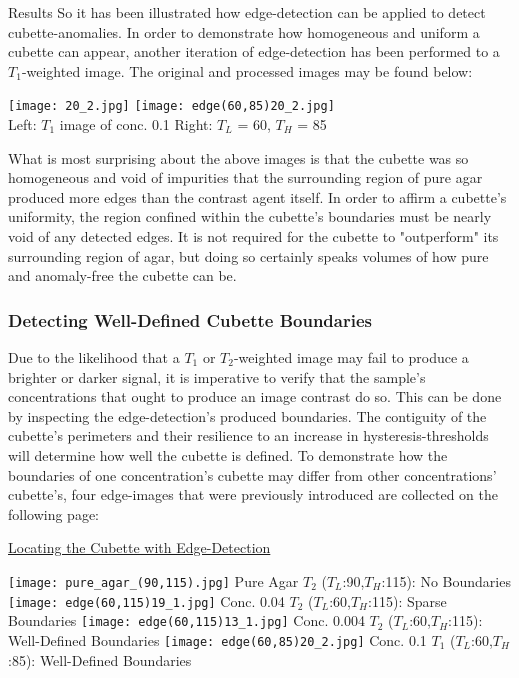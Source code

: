 \documentclass[a4paper,12pt]{article}
\begin{document}
\begin{section}{Results}
So it has been illustrated how edge-detection can be applied to detect cubette-anomalies. In order to demonstrate how homogeneous and uniform a cubette can appear, another iteration of edge-detection has been performed to a $T_1$-weighted image. The original and processed images may be found below:

\begin{center}
\texttt{[image: 20\_2.jpg]}
\texttt{[image: edge(60,85)20\_2.jpg]}\\
\small{Left: $T_1$ image of conc. 0.1} \hspace{13mm} \small{Right: $T_L$ = 60, $T_H$ = 85}
\end{center}

What is most surprising about the above images is that the cubette was so homogeneous and void of impurities that the surrounding region of pure agar produced more edges than the contrast agent itself. In order to affirm a cubette's uniformity, the region confined within the cubette's boundaries must be nearly void of any detected edges. It is not required for the cubette to "outperform" its surrounding region of agar, but doing so certainly speaks volumes of how pure and anomaly-free the cubette can be.

\subsubsection{Detecting Well-Defined Cubette Boundaries}

Due to the likelihood that a $T_1$ or $T_2$-weighted image may fail to produce a brighter or darker signal, it is imperative to verify that the sample's concentrations that ought to produce an image contrast do so. This can be done by inspecting the edge-detection's produced boundaries. The contiguity of the cubette's perimeters and their resilience to an increase in hysteresis-thresholds will determine how well the cubette is defined. To demonstrate how the boundaries of one concentration's cubette may differ from other concentrations' cubette's, four edge-images that were previously introduced are collected on the following page:

\newpage
\begin{center} \underline{Locating the Cubette with Edge-Detection} \end{center}
\begin{flushleft}
\texttt{[image: pure\_agar\_(90,115).jpg]}		\hspace{0.5cm}\small{Pure Agar $T_2$ ($T_L$:90,$T_H$:115): No Boundaries}
\texttt{[image: edge(60,115)19\_1.jpg]}			\hspace{0.5cm}\small{Conc. 0.04 $T_2$ ($T_L$:60,$T_H$:115): Sparse Boundaries}
\texttt{[image: edge(60,115)13\_1.jpg]}			\hspace{0.5cm}\small{Conc. 0.004 $T_2$ ($T_L$:60,$T_H$:115): Well-Defined Boundaries}
\texttt{[image: edge(60,85)20\_2.jpg]}			\hspace{0.5cm}\small{Conc. 0.1 $T_1$ ($T_L$:60,$T_H$:85): Well-Defined Boundaries}
\end{flushleft}


\end{section}
\end{document}
